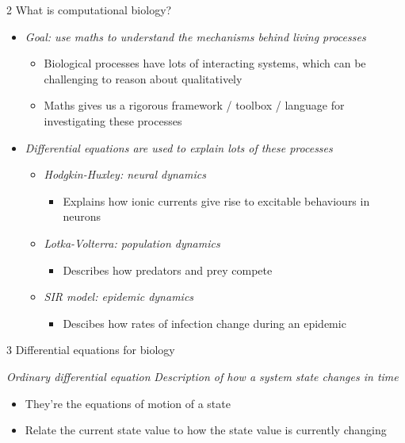 \documentclass[presentation]{beamer}
\begin{document}
\begin{frame}[label={sec:org1b02e71}]{2 What is computational biology?}
\begin{itemize}
\item \emph{Goal: use maths to understand the mechanisms behind living processes}
\begin{itemize}
\item Biological processes have lots of interacting systems, which can be challenging to reason about qualitatively
\item Maths gives us a rigorous framework / toolbox / language for investigating these processes
\end{itemize}

\item \emph{Differential equations are used to explain lots of these processes}
\begin{itemize}
\item \emph{Hodgkin-Huxley: neural dynamics}
\begin{itemize}
\item Explains how ionic currents give rise to excitable behaviours in neurons
\end{itemize}

\item \emph{Lotka-Volterra: population dynamics}
\begin{itemize}
\item Describes how predators and prey compete
\end{itemize}

\item \emph{SIR model: epidemic dynamics}
\begin{itemize}
\item Descibes how rates of infection change during an epidemic
\end{itemize}
\end{itemize}
\end{itemize}
\end{frame}

\begin{frame}[label={sec:orga834507}]{3 Differential equations for biology}
\begin{block}{\emph{Ordinary differential equation}}
\emph{Description of how a system state changes in time}
\end{block}

\begin{block}{}
\begin{itemize}
\item They're the equations of motion of a state
\item Relate the current state value to how the state value is currently changing
\end{itemize}
\end{block}
\end{frame}
\end{document}
